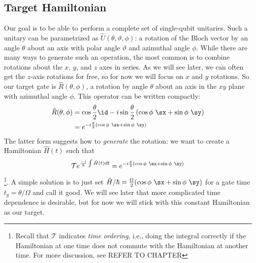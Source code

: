 \subsection{Target Hamiltonian}
Our goal is to be able to perform a complete set of single-qubit unitaries. Such a unitary can be parametrized as $\hat{U}(\theta,\vartheta,\phi)$: a rotation of the Bloch vector by an angle $\theta$ about an axis with polar angle $\vartheta$ and azimuthal angle $\phi$. While there are many ways to generate such an operation, the most common is to combine rotations about the $x$, $y$, and $z$ axes in series. As we will see later, we can often get the $z$-axis rotations for free, so for now we will focus on $x$ and $y$ rotations. So our target gate is $\hat{R}(\theta,\phi)$, a rotation by angle $\theta$ about an axis in the $xy$ plane with azimuthal angle $\phi$. This operator can be written compactly:
\begin{align}
    \hat{R}(\theta,\phi) &= \cos\frac{\theta}{2} \id - i \sin\frac{\theta}{2}\left(\cos\phi \ \sx + \sin\phi \ \sy\right) \\
    &= e^{-i \frac{\theta}{2} (\cos\phi \ \sx + \sin\phi \ \sy)}
\end{align}
The latter form suggests how to \textit{generate} the rotation: we want to create a Hamiltonian $\hat{H}(t)$ such that 
\begin{equation*}
    \mathcal{T} e^{\frac{-i}{\hbar} \int \hat{H}(t)dt}=e^{-i \frac{\theta}{2} (\cos\phi \ \sx + \sin\phi \ \sy)}
\end{equation*}
\footnote{Recall that $\mathcal{T}$ indicates \textit{time ordering}, i.e., doing the integral correctly if the Hamiltonian at one time does not commute with the Hamiltonian at another time. For more discussion, see REFER TO CHAPTER}. A simple solution is to just set $\hat{H}/\hbar=\frac{\Omega}{2} (\cos\phi \ \sx + \sin\phi \ \sy)$ for a gate time $t_g = \theta/\Omega$ and call it good. We will see later that more complicated time dependence is desirable, but for now we will stick with this constant Hamiltonian as our target.
